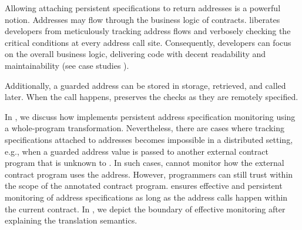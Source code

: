 
Allowing attaching persistent specifications to return addresses is a powerful notion.
Addresses may flow through the business logic of contracts. 
\lang liberates developers from meticulously tracking
address flows and verbosely checking the
critical conditions at every address call site. 
Consequently, developers can focus on the overall business logic,
delivering code with decent readability and maintainability (see case studies ).

Additionally, a guarded address can be stored in storage,
retrieved, and called later. When the call happens, \lang preserves the checks 
as they are remotely specified.

In , we discuss how \lang implements persistent address
specification monitoring using a whole-program transformation.
Nevertheless, there are cases where tracking specifications attached to addresses
becomes impossible in a distributed setting, e.g., when a guarded address value 
is passed to another external contract program that is unknown to \lang.
In such cases, \lang cannot  monitor how the external contract program uses the address.
However, programmers can still trust \lang within the scope of the annotated
contract program. \lang ensures effective and persistent monitoring of address specifications
as long as the address calls happen within the current contract.
In , we depict the boundary of effective monitoring after 
explaining the translation semantics.


